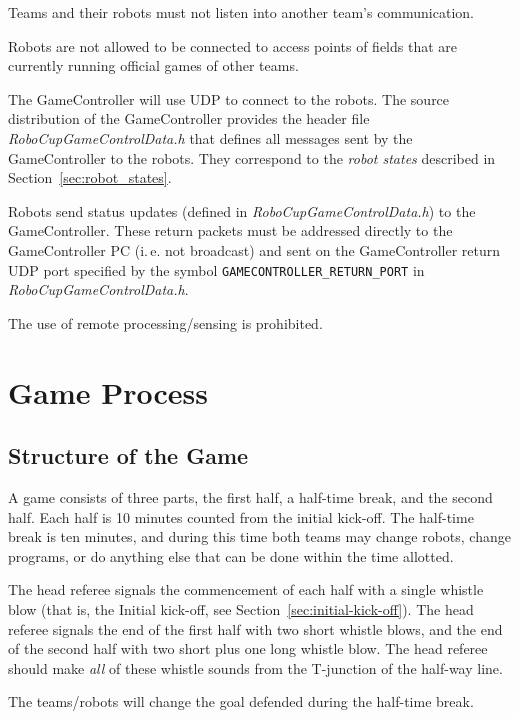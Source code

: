 \documentclass[12pt]{article}
\newcommand{\ie}{\mbox{i.\,e.}\xspace}
\newcommand{\cf}{see\xspace}
\begin{document}
Teams and their robots must not listen into another team's communication.

Robots are not allowed to be connected to access points of fields that are currently running official games of other teams.

The GameController will use UDP to connect to the robots. The source distribution of the GameController provides the header file \emph{RoboCupGameControlData.h} that defines all messages sent by the GameController to the robots. They correspond to the \emph{robot states} described in Section~\ref{sec:robot_states}.

Robots send status updates (defined in \emph{RoboCupGameControlData.h}) to the GameController. These return packets must be addressed directly to the GameController PC (\ie not broadcast) and sent on the GameController return UDP port specified by the symbol \verb!GAMECONTROLLER_RETURN_PORT! in \emph{RoboCupGameControlData.h}.

The use of remote processing/sensing is prohibited.


\newpage


\section{Game Process}
\label{sec:game_process}

\subsection{Structure of the Game}
\label{sec:game_struct}

A game consists of three parts, the first half, a half-time break, and the second half. Each half is 10 minutes counted from the initial kick-off. 
The half-time break is ten minutes, and during this time both teams may change robots, change programs, or do anything else that can be done within the time allotted.

The head referee signals the commencement of each half with a single whistle blow (that is, the Initial kick-off, \cf Section~\ref{sec:initial-kick-off}).
The head referee signals the end of the first half with two short whistle blows, and the end of the second half with two short plus one long whistle blow.
The head referee should make \textit{all} of these whistle sounds from the T-junction of the half-way line.

The teams/robots will change the goal defended during the half-time break.
\end{document}
